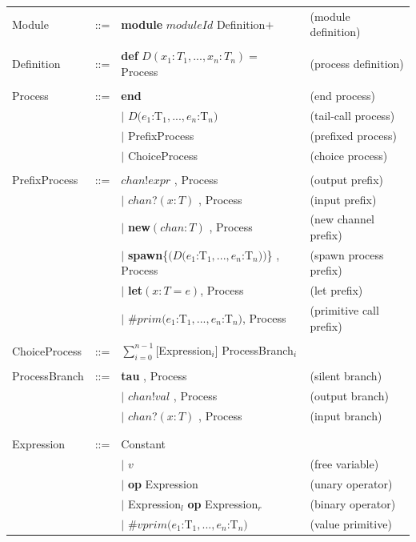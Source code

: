 \documentclass[a4paper,11pt]{article}
\newcommand{\kw}[1]{\textsf{\textbf{#1}}}
\newcommand{\code}[1]{\textsf{#1}}
\begin{document}
\begin{tabular}{llll}
Module & ::= & \kw{module} $moduleId$ Definition$+$ & (module definition) \\
\\
Definition & ::= &  \kw{def} $D(x_1:T_1, ..., x_n:T_n) = $ Process & (process definition) \\
\\
Process & ::= & \kw{end} & (end process) \\
        &    &  $|$ $D(e_1$:T$_1, ..., e_n$:T$_n)$ & (tail-call process) \\
        &    &  $|$ PrefixProcess & (prefixed process) \\
        &    &  $|$ ChoiceProcess & (choice process) \\
\\
PrefixProcess & ::= & $chan$\code{!}$expr$ \code{,} Process & (output prefix) \\
              &     & $|$ $chan$\code{?}$(x:T)$ \code{,} Process & (input prefix) \\
              &     & $|$ \kw{new}$(chan:T)$ \code{,} Process & (new channel prefix) \\
              &     & $|$ \kw{spawn}\code{\{}$(D(e_1$:T$_1, ..., e_n$:T$_n))$\code{\}} \code{,} Process & (spawn process prefix) \\
              &     & $|$ \kw{let}$(x:T=e)$\code{,} Process & (let prefix) \\
              &     & $|$ \code{\#}$prim(e_1$:T$_1, ..., e_n$:T$_n)$\code{,} Process & (primitive call prefix) \\
\\
ChoiceProcess & ::= & $\sum_{i=0}^{n-1}$\code{[}Expression$_i$\code{]} ProcessBranch$_i$ \\
\\
ProcessBranch & ::= & \kw{tau} \code{,} Process & (silent branch) \\
              &     & $|$ $chan$\code{!}$val$ \code{,} Process & (output branch) \\
              &     & $|$ $chan$\code{?}$(x:T)$ \code{,} Process & (input branch) \\
\\
\\
Expression & ::= & Constant \\
           &     & $|$ $v$  & (free variable) \\
           &     & $|$ \kw{op} Expression & (unary operator) \\
           &     & $|$ Expression$_l$ \kw{op} Expression$_r$  & (binary operator) \\
           &     & $|$ \code{\#}$vprim(e_1$:T$_1, ..., e_n$:T$_n)$ & (value primitive) \\
\end{tabular}
\end{document}
